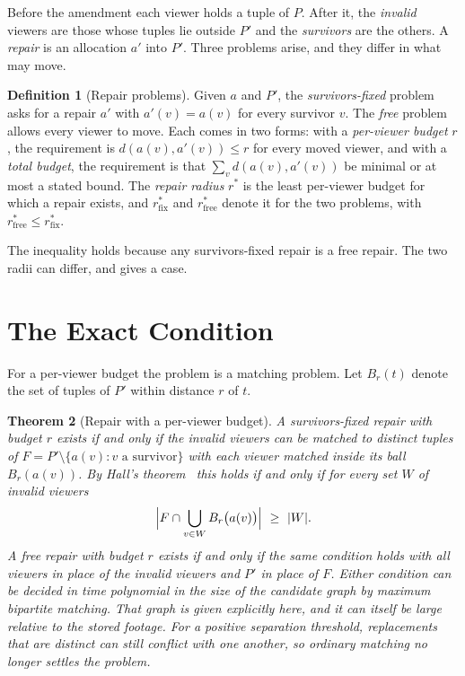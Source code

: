\documentclass[11pt,twoside,openright]{book}
\theoremstyle{plain}
\newtheorem{theorem}{Theorem}[chapter]
\theoremstyle{definition}
\newtheorem{definition}[theorem]{Definition}
\theoremstyle{remark}
\begin{document}
Before the amendment each viewer holds a tuple of $P$. After it, the \emph{invalid} viewers are those whose tuples lie outside $P'$ and the \emph{survivors} are the others. A \emph{repair} is an allocation $a'$ into $P'$. Three problems arise, and they differ in what may move.

\begin{definition}[Repair problems]\label{def:repair}
Given $a$ and $P'$, the \emph{survivors-fixed} problem asks for a repair $a'$ with $a'(v)=a(v)$ for every survivor $v$. The \emph{free} problem allows every viewer to move. Each comes in two forms: with a \emph{per-viewer budget} $r$, the requirement is $d(a(v),a'(v))\le r$ for every moved viewer, and with a \emph{total budget}, the requirement is that $\sum_vd(a(v),a'(v))$ be minimal or at most a stated bound. The \emph{repair radius} $r^\ast$ is the least per-viewer budget for which a repair exists, and $r^\ast_{\mathrm{fix}}$ and $r^\ast_{\mathrm{free}}$ denote it for the two problems, with $r^\ast_{\mathrm{free}}\le r^\ast_{\mathrm{fix}}$.
\end{definition}

The inequality holds because any survivors-fixed repair is a free repair. The two radii can differ, and  gives a case.

\section{The Exact Condition}\label{sec:hall}

For a per-viewer budget the problem is a matching problem. Let $B_r(t)$ denote the set of tuples of $P'$ within distance $r$ of $t$.

\begin{theorem}[Repair with a per-viewer budget]\label{thm:repair}
A survivors-fixed repair with budget $r$ exists if and only if the invalid viewers can be matched to distinct tuples of $F=P'\setminus\{a(v):v\text{ a survivor}\}$ with each viewer matched inside its ball $B_r(a(v))$. By Hall's theorem~\cite{hall1935} this holds if and only if for every set $W$ of invalid viewers
\[
\Bigl\lvert F\cap\bigcup_{v\in W}B_r\bigl(a(v)\bigr)\Bigr\rvert\ \ge\ \lvert W\rvert .
\]
A free repair with budget $r$ exists if and only if the same condition holds with all viewers in place of the invalid viewers and $P'$ in place of $F$. Either condition can be decided in time polynomial in the size of the candidate graph by maximum bipartite matching. That graph is given explicitly here, and it can itself be large relative to the stored footage. For a positive separation threshold, replacements that are distinct can still conflict with one another, so ordinary matching no longer settles the problem.
\end{theorem}
\end{document}
